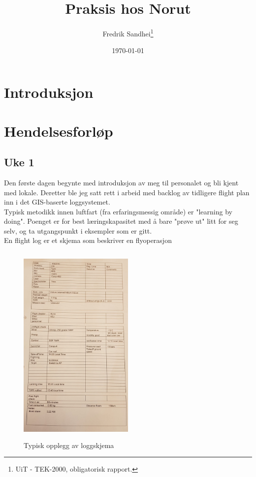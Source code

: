 \documentclass[11pt, a4paper]{report}
\begin{document}
\title{\\Praksis hos Norut}
\author{Fredrik Sandhei\thanks{UiT - TEK-2000, obligatorisk rapport.}}

\date{\today}
\maketitle
\newpage
\tableofcontents
\newpage

\chapter{Introduksjon}
\chapter{Hendelsesforløp}
\section{Uke 1}
Den første dagen begynte med introduksjon av meg til personalet og bli kjent med lokale. Deretter ble jeg satt rett i arbeid med backlog av tidligere flight plan inn i det GIS-baserte loggsystemet. \\
Typisk metodikk innen luftfart (fra erfaringsmessig område) er "learning by doing". Poenget er for best læringskapasitet med å bare "prøve ut" litt for seg selv, og ta utgangspunkt i eksempler som er gitt.\\
En flight log er et skjema som beskriver en flyoperasjon %

\begin{figure}[h]
	\caption{Typisk opplegg av loggskjema}
	\centering
	\includegraphics[height= 10cm, width=0.5\textwidth]{flightlogNorut.png}
\end{figure}
\end{document}
